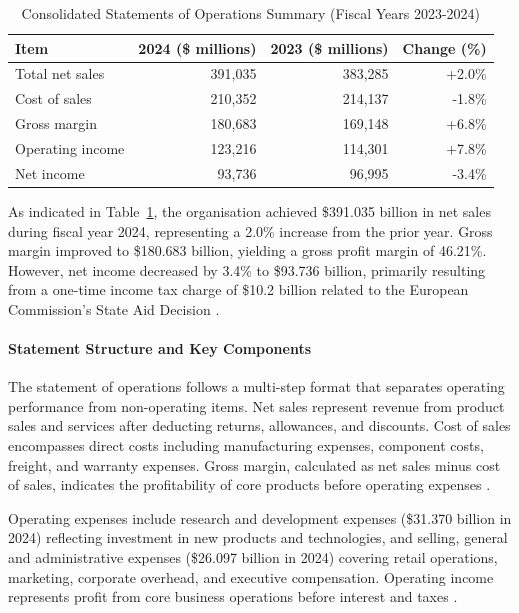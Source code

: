 \documentclass[12pt,a4paper]{article}
\begin{document}
\begin{table}[H]
\centering
\caption{Consolidated Statements of Operations Summary (Fiscal Years 2023-2024)}
\label{tab:operations_summary}
\begin{tabular}{lrrr}
\toprule
\textbf{Item} & \textbf{2024 (\$ millions)} & \textbf{2023 (\$ millions)} & \textbf{Change (\%)} \\
\midrule
Total net sales & 391,035 & 383,285 & +2.0\% \\
Cost of sales & 210,352 & 214,137 & -1.8\% \\
Gross margin & 180,683 & 169,148 & +6.8\% \\
Operating income & 123,216 & 114,301 & +7.8\% \\
Net income & 93,736 & 96,995 & -3.4\% \\
\bottomrule
\end{tabular}
\end{table}

As indicated in Table~\ref{tab:operations_summary}, the organisation achieved \$391.035 billion in net sales during fiscal year 2024, representing a 2.0\% increase from the prior year. Gross margin improved to \$180.683 billion, yielding a gross profit margin of 46.21\%. However, net income decreased by 3.4\% to \$93.736 billion, primarily resulting from a one-time income tax charge of \$10.2 billion related to the European Commission's State Aid Decision \citep{apple202410k}.

\paragraph{Statement Structure and Key Components}

The statement of operations follows a multi-step format that separates operating performance from non-operating items. Net sales represent revenue from product sales and services after deducting returns, allowances, and discounts. Cost of sales encompasses direct costs including manufacturing expenses, component costs, freight, and warranty expenses. Gross margin, calculated as net sales minus cost of sales, indicates the profitability of core products before operating expenses \citep{kieso2023}.

Operating expenses include research and development expenses (\$31.370 billion in 2024) reflecting investment in new products and technologies, and selling, general and administrative expenses (\$26.097 billion in 2024) covering retail operations, marketing, corporate overhead, and executive compensation. Operating income represents profit from core business operations before interest and taxes \citep{apple202410k}.
\end{document}
